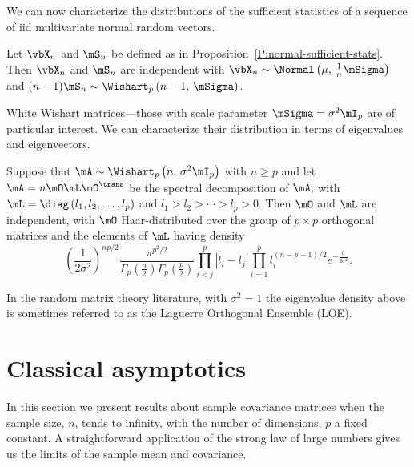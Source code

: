 We can now characterize the distributions of the sufficient statistics of a sequence of iid multivariate normal random vectors.

\begin{proposition}
Let 
\(
    \vbX_n
\) 
and 
\(
    \mS_n
\)
be defined as in Proposition~\ref{P:normal-sufficient-stats}.  Then
\(
    \vbX_n
\)
and
\(
    \mS_n
\)
are independent with
\(
    \vbX_n
    \sim
    \Normal \left(
        \mu, \,
        \frac{1}{n}
        \mSigma
    \right)
\)
and
\(
    (n-1)
    \mS_n
    \sim
    \Wishart_p \left(
        n-1, \,
        \mSigma
    \right)
\).
\end{proposition}

White Wishart matrices---those with scale parameter $\mSigma = \sigma^2 \mI_p$
are of particular interest.  We can characterize their distribution in
terms of eigenvalues and eigenvectors.

\begin{proposition}
Suppose that
\(
    \mA
    \sim
    \Wishart_p \left(
        n, \,
        \sigma^2 \mI_p
    \right)
\)
with
\(
    n \geq p
\)
and let
\(
    \mA = n \mO \mL \mO^\trans
\)
be the spectral decomposition of
\(
    \mA,
\)
with
\(
    \mL
    =
    \diag \left(
        l_1,
        l_2,
        \ldots,
        l_p
    \right)
\)
and
\(
    l_1
    >
    l_2
    >
    \cdots
    >
    l_p
    >
    0.
\)
Then $\mO$ and $\mL$ are independent, with $\mO$ Haar-distributed over
the group of $p \times p$ orthogonal matrices and the elements of $\mL$
having density
\begin{equation}\label{E:wishart-eig-density}
    \left(
        \frac{1}{2 \sigma^2 }
    \right)^{np/2}
    \frac{ \pi^{p^2/2} }
         { \Gamma_p \left( \frac{n}{2} \right) 
           \Gamma_p \left( \frac{p}{2} \right) }
    \prod_{i < j}^p
        \left| l_i - l_j \right|
    \prod_{i=1}^p
        l_i^{(n-p-1)/2}
        e^{-\tfrac{l_i}{2 \sigma^2}}
        .
\end{equation}    
\end{proposition}
\noindent
In the random matrix theory literature, with $\sigma^2 = 1$ the eigenvalue density above is sometimes referred to as the Laguerre Orthogonal Ensemble (LOE).

\section{Classical asymptotics}\label{S:multivariate-classical}

In this section we present results about sample covariance matrices when the sample size, $n$, tends to infinity, with the number of dimensions, $p$ a fixed constant.  A straightforward application of the strong law of large numbers gives us the limits of the sample mean and covariance.

